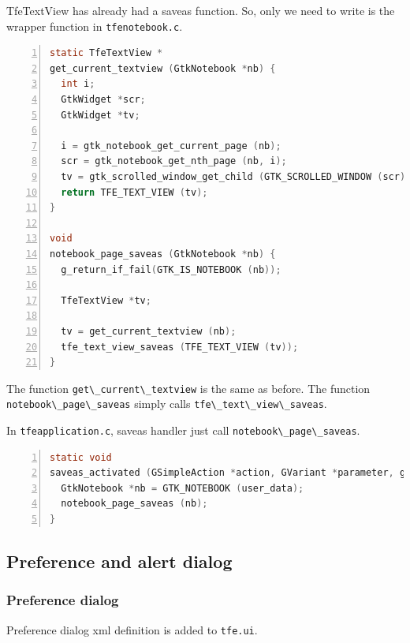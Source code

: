 TfeTextView has already had a saveas function. So, only we need to write
is the wrapper function in \passthrough{\lstinline!tfenotebook.c!}.

\begin{lstlisting}[language=C, numbers=left]
static TfeTextView *
get_current_textview (GtkNotebook *nb) {
  int i;
  GtkWidget *scr;
  GtkWidget *tv;

  i = gtk_notebook_get_current_page (nb);
  scr = gtk_notebook_get_nth_page (nb, i);
  tv = gtk_scrolled_window_get_child (GTK_SCROLLED_WINDOW (scr));
  return TFE_TEXT_VIEW (tv);
}

void
notebook_page_saveas (GtkNotebook *nb) {
  g_return_if_fail(GTK_IS_NOTEBOOK (nb));

  TfeTextView *tv;

  tv = get_current_textview (nb);
  tfe_text_view_saveas (TFE_TEXT_VIEW (tv));
}
\end{lstlisting}

The function \passthrough{\lstinline!get\_current\_textview!} is the
same as before. The function
\passthrough{\lstinline!notebook\_page\_saveas!} simply calls
\passthrough{\lstinline!tfe\_text\_view\_saveas!}.

In \passthrough{\lstinline!tfeapplication.c!}, saveas handler just call
\passthrough{\lstinline!notebook\_page\_saveas!}.

\begin{lstlisting}[language=C, numbers=left]
static void
saveas_activated (GSimpleAction *action, GVariant *parameter, gpointer user_data) {
  GtkNotebook *nb = GTK_NOTEBOOK (user_data);
  notebook_page_saveas (nb);
}
\end{lstlisting}

\hypertarget{preference-and-alert-dialog}{%
\subsection{Preference and alert
dialog}\label{preference-and-alert-dialog}}

\hypertarget{preference-dialog}{%
\subsubsection{Preference dialog}\label{preference-dialog}}

Preference dialog xml definition is added to
\passthrough{\lstinline!tfe.ui!}.

